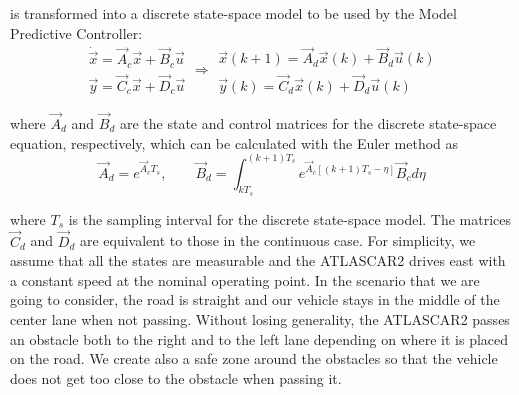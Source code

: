 is transformed into a discrete state-space model to be used by the Model Predictive Controller:
\begin{equation}
\label{eqn:dynamics_ss_obstacle_avoidance_dis}
\begin{array}{ll}
\dot{\vec{x}} =\vec{A}_c \vec{x}+ \vec{B}_c \vec{u}\\
\vec{y} =\vec{C}_c \vec{x} + \vec{D}_c \vec{u}
\end{array}
\Longrightarrow
\begin{array}{rr}
{\vec{x}}(k+1) =\vec{A}_d \vec{x}(k)+ \vec{B}_d \vec{u}(k)\\
\vec{y}(k) =\vec{C}_d \vec{x}(k) + \vec{D}_d \vec{u}(k)
\end{array}
\end{equation}

where $\vec{A}_d$ and $\vec{B}_d$ are the state and control matrices for the discrete state-space equation, respectively, which can be calculated with the Euler method as
\begin{equation}
\vec{A}_d = e^{\vec{A}_cT_s},\qquad \vec{B}_d = \int_{kT_s}^{(k+1)T_s} e^{\vec{A}_c[(k+1)T_s-\eta]}\vec{B}_c d\eta
\end{equation}

where $T_s$ is the sampling interval for the discrete state-space model. The matrices $\vec{C}_d$ and $\vec{D}_d$ are equivalent to those in the continuous case. For simplicity, we assume that all the states are measurable and the ATLASCAR2 drives east with a constant speed at the nominal operating point. In the scenario that we are going to consider, the road is straight and our vehicle stays in the middle of the center lane when not passing. Without losing generality, the ATLASCAR2 passes an obstacle both to the right and to the left lane depending on where it is placed on the road. We create also a safe zone around the obstacles so that the vehicle does not get too close to the obstacle when passing it.

